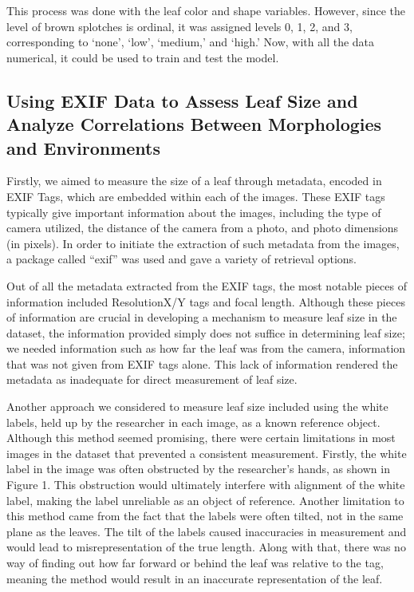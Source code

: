\documentclass[final,5p,times,twocolumn,authoryear]{elsarticle}
\begin{document}
This process was done with the leaf color and shape variables. However, since the level of brown splotches is ordinal, it was assigned levels 0, 1, 2, and 3, corresponding to ‘none’, ‘low’, ‘medium,’ and ‘high.’ Now, with all the data numerical, it could be used to train and test the model.

\subsection{Using EXIF Data to Assess Leaf Size and Analyze Correlations Between Morphologies and Environments}
\label{step_4}

Firstly, we aimed to measure the size of a leaf through metadata, encoded in EXIF Tags, which are embedded within each of the images. These EXIF tags typically give important information about the images, including the type of camera utilized, the distance of the camera from a photo, and photo dimensions (in pixels). In order to initiate the extraction of such metadata from the images, a package called “exif” was used and gave a variety of retrieval options. 

Out of all the metadata extracted from the EXIF tags, the most notable pieces of information included ResolutionX/Y tags and focal length. Although these pieces of information are crucial in developing a mechanism to measure leaf size in the dataset, the information provided simply does not suffice in determining leaf size; we needed information such as how far the leaf was from the camera, information that was not given from EXIF tags alone. This lack of information rendered the metadata as inadequate for direct measurement of leaf size. 

Another approach we considered to measure leaf size included using the white labels, held up by the researcher in each image, as a known reference object. Although this method seemed promising, there were certain limitations in most images in the dataset that prevented a consistent measurement. Firstly, the white label in the image was often obstructed by the researcher’s hands, as shown in Figure 1. This obstruction would ultimately interfere with alignment of the white label, making the label unreliable as an object of reference. Another limitation to this method came from the fact that the labels were often tilted, not in the same plane as the leaves. The tilt of the labels caused inaccuracies in measurement and would lead to misrepresentation of the true length. Along with that, there was no way of finding out how far forward or behind the leaf was relative to the tag, meaning the method would result in an inaccurate representation of the leaf.
\end{document}
